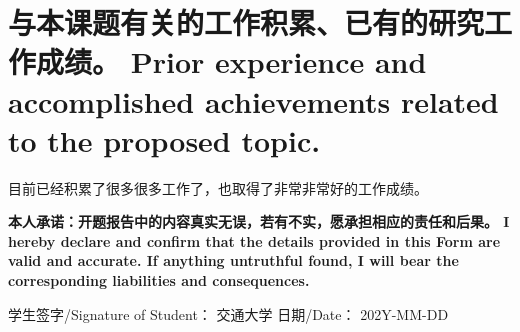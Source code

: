 \documentclass[a4paper,zihao=-4,AutoFakeBold]{ctexart}
\begin{document}
\section{与本课题有关的工作积累、已有的研究工作成绩。
    Prior experience and accomplished achievements 
    related to the proposed topic.}


目前已经积累了很多很多工作了，也取得了非常非常好的工作成绩。




\vspace{\baselineskip}

\normalfont{}\bfseries\fangsong
\noindent
本人承诺：开题报告中的内容真实无误，若有不实，愿承担相应的责任和后果。
I hereby declare and confirm that the details 
provided in this Form are valid and accurate. 
If anything untruthful found, 
I will bear the corresponding liabilities and consequences.

\vspace{\baselineskip}

\noindent
学生签字/Signature of Student： 交通大学
\hfill              
日期/Date： 202Y-MM-DD
\end{document}
